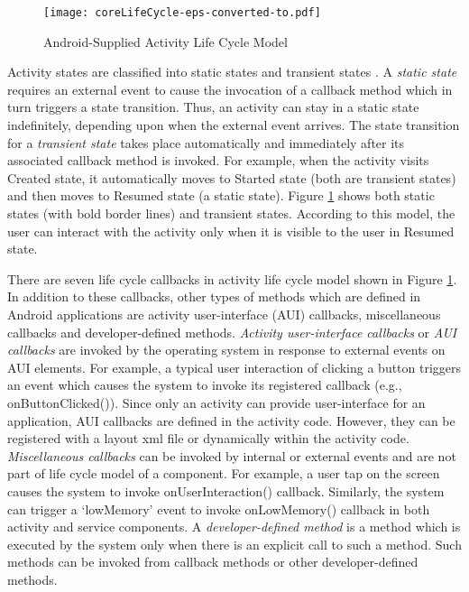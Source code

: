 \documentclass[10pt]{elsarticle}
\begin{document}
\begin{comment}
\begin{figure}\centering
  \epsfig{file=coreLifeCycle.eps, width=12cm}
  \caption{Android-Supplied Activity Life Cycle Model}
  \label{coreLifeCycle}
\end{figure}
\end{comment}


\begin{figure}[ht!]
\centering
\texttt{[image: coreLifeCycle-eps-converted-to.pdf]}
 \caption{Android-Supplied Activity Life Cycle Model \cite{activityLifeCycle}}
  \label{coreLifeCycle}
\end{figure}


Activity states are classified into static states and transient states \cite{activityLifeCycle}. A \emph{static state} requires an external event to cause the invocation of a callback method which in turn triggers a state transition. Thus, an activity can stay in a static state indefinitely, depending upon when the external event arrives. The state transition for a \emph{transient state} takes place automatically and immediately after its associated callback method is invoked. For example, when the activity visits Created state, it automatically moves to Started state (both are transient states) and then moves to Resumed state (a static state). Figure \ref{coreLifeCycle} shows both static states (with bold border lines) and transient states. According to this model, the user can interact with the activity only when it is visible to the user in Resumed state. 


There are seven life cycle callbacks in activity life cycle model shown in Figure \ref{coreLifeCycle}. In addition to these callbacks, other types of methods which are defined in Android applications are activity user-interface (AUI) callbacks, miscellaneous callbacks and developer-defined methods. \emph{Activity user-interface callbacks} or \emph{AUI callbacks} are invoked by the operating system in response to external events on AUI elements. For example, a typical user interaction of clicking a button triggers an event which causes the system to invoke its registered callback (e.g., {\ttfamily onButtonClicked()}). Since only an activity can provide user-interface for an application, AUI callbacks are defined in the activity code. However, they can be registered with a layout xml file or dynamically within the activity code. \emph{Miscellaneous callbacks} can be invoked by internal or external events and are not part of life cycle model of a component. For example, a user tap on the screen causes the system to invoke {\ttfamily onUserInteraction()} callback. Similarly, the system can trigger a `lowMemory' event to invoke {\ttfamily onLowMemory()} callback in both activity and service components. A \emph{developer-defined method} is a method which is executed by the system only when there is an explicit call to such a method. Such methods can be invoked from callback methods or other developer-defined methods.
\end{document}
